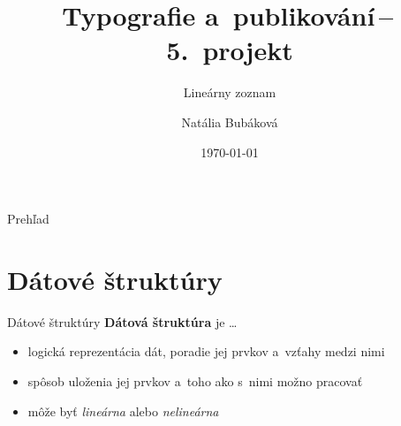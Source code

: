 \documentclass[slovak, 11pt]{beamer}
\title{Typografie a~publikování\,--\,5.~projekt}
\subtitle{Lineárny zoznam}
\author{Natália Bubáková}
\institute{VUT FIT}
\date{\today}
\begin{document}
\begin{frame}
  \titlepage
\end{frame}


\begin{frame}{Prehľad}
  \tableofcontents
\end{frame}


\section{Dátové štruktúry}

\begin{frame}{Dátové štruktúry}
    \textbf{Dátová štruktúra} je \dots
    \begin{itemize}
        \item logická reprezentácia dát, poradie jej prvkov a~vzťahy medzi nimi
        \item spôsob uloženia jej prvkov a~toho ako s~nimi možno pracovať
        \item môže byť \emph{lineárna} alebo \emph{nelineárna}
    \end{itemize}
    

\end{frame}
\end{document}
